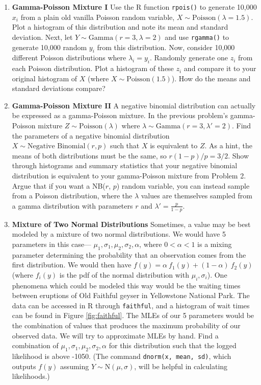 \documentclass[
]{krantz}
\begin{document}
\begin{enumerate}
\def\labelenumi{\arabic{enumi}.}
\setcounter{enumi}{1}
\item
  \textbf{Gamma-Poisson Mixture I} Use the R function \texttt{rpois()} to generate 10,000 \(x_i\) from a plain old vanilla Poisson random variable, \(X \sim \textrm{Poisson}(\lambda=1.5)\). Plot a histogram of this distribution and note its mean and standard deviation. Next, let \(Y \sim \textrm{Gamma}(r = 3, \lambda = 2)\) and use \texttt{rgamma()} to generate 10,000 random \(y_i\) from this distribution. Now, consider 10,000 different Poisson distributions where \(\lambda_i = y_i\). Randomly generate one \(z_i\) from each Poisson distribution. Plot a histogram of these \(z_i\) and compare it to your original histogram of \(X\) (where \(X \sim \textrm{Poisson}(1.5)\)). How do the means and standard deviations compare?
\item
  \textbf{Gamma-Poisson Mixture II} A negative binomial distribution can actually be expressed as a gamma-Poisson mixture.
  In the previous problem's gamma-Poisson mixture \(Z \sim \textrm{Poisson}(\lambda)\) where \(\lambda \sim \textrm{Gamma}(r = 3, \lambda' = 2)\).
  Find the parameters of a negative binomial distribution \(X \sim \textrm{Negative Binomial}(r, p)\) such that \(X\) is equivalent to \(Z\). As a hint, the means of both distributions must be the same, so \(r(1-p)/p = 3/2\). Show through histograms and summary statistics that your negative binomial distribution is equivalent to your gamma-Poisson mixture from Problem 2. Argue that if you want a NB(\(r\), \(p\)) random variable, you can instead sample from a Poisson distribution, where the \(\lambda\) values are themselves sampled from a gamma distribution with parameters \(r\) and \(\lambda' = \frac{p}{1-p}\).
\item
  \textbf{Mixture of Two Normal Distributions} Sometimes, a value may be best modeled by a mixture of two normal distributions. We would have 5 parameters in this case--- \(\mu_1, \sigma_1, \mu_2, \sigma_2, \alpha\), where \(0 < \alpha < 1\) is a mixing parameter determining the probability that an observation comes from the first distribution. We would then have \(f(y) = \alpha\ f_1(y) + (1-\alpha)\ f_2(y)\) (where \(f_i(y)\) is the pdf of the normal distribution with \(\mu_i, \sigma_i\)). One phenomena which could be modeled this way would be the waiting times between eruptions of Old Faithful geyser in Yellowstone National Park. The data can be accessed in R through \texttt{faithful}, and a histogram of wait times can be found in Figure \ref{fig:faithful}. The MLEs of our 5 parameters would be the combination of values that produces the maximum probability of our observed data. We will try to approximate MLEs by hand. Find a combination of \(\mu_1, \sigma_1, \mu_2, \sigma_2, \alpha\) for this distribution such that the logged likelihood is above -1050. (The command \texttt{dnorm(x,\ mean,\ sd)}, which outputs \(f(y)\) assuming \(Y \sim \textrm{N}(\mu, \sigma)\), will be helpful in calculating likelihoods.)
\end{enumerate}
\end{document}
